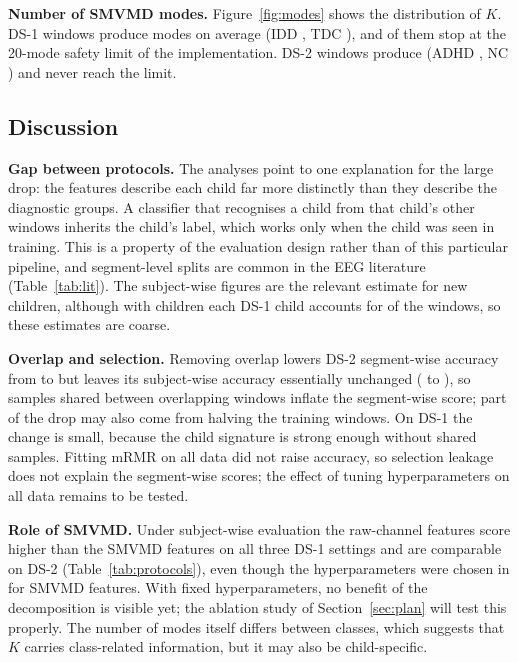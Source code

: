 \documentclass[11pt,a4paper]{article}
\begin{document}
\textbf{Number of SMVMD modes.} Figure~\ref{fig:modes} shows the distribution
of $K$. DS-1 windows produce \modeMeanDsOne{} modes on average (IDD
\modeDisDsOne{}, TDC \modeCtlDsOne{}), and \modeCapDsOne{} of them stop at the
20-mode safety limit of the implementation. DS-2 windows produce
\modeMeanDsTwo{} (ADHD \modeDisDsTwo{}, NC \modeCtlDsTwo{}) and never reach the
limit.

\subsection{Discussion}

\textbf{Gap between protocols.} The analyses point to one explanation for
the large drop: the features describe each child far more distinctly than
they describe the diagnostic groups. A classifier that recognises a child from
that child's other windows inherits the child's label, which works only when
the child was seen in training. This is a property of the evaluation design
rather than of this particular pipeline, and segment-level splits are common
in the EEG literature (Table~\ref{tab:lit}). The subject-wise figures are the
relevant estimate for new children, although with \nSubjRest{} children each
DS-1 child accounts for \subjIDchanceRest{} of the windows, so these estimates
are coarse.

\textbf{Overlap and selection.} Removing overlap lowers DS-2 segment-wise
accuracy from \accSegFiftyAdhd{} to \accSegZeroAdhd{} but leaves its
subject-wise accuracy essentially unchanged (\accSubjFiftyAdhd{} to
\accSubjZeroAdhd{}), so samples shared between overlapping windows inflate the
segment-wise score; part of the drop may also come from halving the training
windows. On DS-1 the change is small, because the child signature is strong
enough without shared samples. Fitting mRMR on all data did not raise
accuracy, so selection leakage does not explain the segment-wise scores; the
effect of tuning hyperparameters on all data remains to be tested.

\textbf{Role of SMVMD.} Under subject-wise evaluation the raw-channel
features score higher than the SMVMD features on all three DS-1 settings and
are comparable on DS-2 (Table~\ref{tab:protocols}), even though the
hyperparameters were chosen in \cite{chandela2025} for SMVMD features. With
fixed hyperparameters, no benefit of the decomposition is visible yet; the
ablation study of Section~\ref{sec:plan} will test this properly. The number of
modes itself differs between classes, which suggests that $K$ carries
class-related information, but it may also be child-specific.
\end{document}
